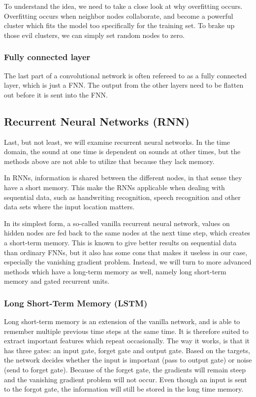To understand the idea, we need to take a close look at why overfitting occurs. Overfitting occurs when neighbor nodes collaborate, and become a powerful cluster which fits the model too specifically for the training set. To brake up those evil clusters, we can simply set random nodes to zero. \cite{Dropout}

\subsubsection*{Fully connected layer}
The last part of a convolutional network is often refereed to as a fully connected layer, which is just a FNN. The output from the other layers need to be flatten out before it is sent into the FNN.

\subsection{Recurrent Neural Networks (RNN)}
Last, but not least, we will examine recurrent neural networks. In the time domain, the sound at one time is dependent on sounds at other times, but the methods above are not able to utilize that because they lack memory. 

In RNNs, information is shared between the different nodes, in that sense they have a short memory. This make the RNNs applicable when dealing with sequential data, such as handwriting recognition, speech recognition and other data sets where the input location matters. 

In its simplest form, a so-called vanilla recurrent neural network, values on hidden nodes are fed back to the same nodes at the next time step, which creates a short-term memory. This is known to give better results on sequential data than ordinary FNNs, but it also has some cons that makes it useless in our case, especially the vanishing gradient problem. Instead, we will turn to more advanced methods which have a long-term memory as well, namely long short-term memory and gated recurrent units.

\subsubsection*{Long Short-Term Memory (LSTM)}
Long short-term memory is an extension of the vanilla network, and is able to remember multiple previous time steps at the same time. It is therefore suited to extract important features which repeat occasionally. The way it works, is that it has three gates: an input gate, forget gate and output gate. Based on the targets, the network decides whether the input is important (pass to output gate) or noise (send to forget gate). Because of the forget gate, the gradients will remain steep and the vanishing gradient problem will not occur. Even though an input is sent to the forgot gate, the information will still be stored in the long time memory. \cite{lstm}


